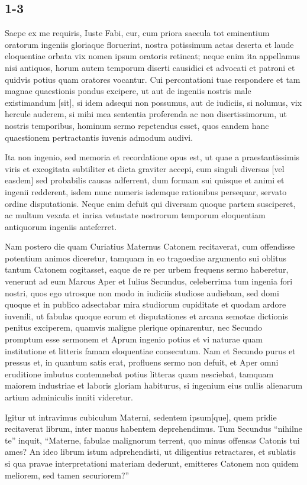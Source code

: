 \subsection*{1-3}

Saepe ex me requiris, Iuste Fabi, cur, cum priora saecula tot eminentium oratorum ingeniis gloriaque floruerint, nostra potissimum aetas deserta et laude eloquentiae orbata vix nomen ipsum oratoris retineat; neque enim ita appellamus nisi antiquos, horum autem temporum diserti causidici et advocati et patroni et quidvis potius quam oratores vocantur. Cui percontationi tuae respondere et tam magnae quaestionis pondus excipere, ut aut de ingeniis nostris male existimandum [sit], si idem adsequi non possumus, aut de iudiciis, si nolumus, vix hercule auderem, si mihi mea sententia proferenda ac non disertissimorum, ut nostris temporibus, hominum sermo repetendus esset, quos eandem hanc quaestionem pertractantis iuvenis admodum audivi. 

Ita non ingenio, sed memoria et recordatione opus est, ut quae a praestantissimis viris et excogitata subtiliter et dicta graviter accepi, cum singuli diversas [vel easdem] sed probabilis causas adferrent, dum formam sui quisque et animi et ingenii redderent, isdem nunc numeris isdemque rationibus persequar, servato ordine disputationis. Neque enim defuit qui diversam quoque partem susciperet, ac multum vexata et inrisa vetustate nostrorum temporum eloquentiam antiquorum ingeniis anteferret.

Nam postero die quam Curiatius Maternus Catonem recitaverat, cum offendisse potentium animos diceretur, tamquam in eo tragoediae argumento sui oblitus tantum Catonem cogitasset, eaque de re per urbem frequens sermo haberetur, venerunt ad eum Marcus Aper et Iulius Secundus, celeberrima tum ingenia fori nostri, quos ego utrosque non modo in iudiciis studiose audiebam, sed domi quoque et in publico adsectabar mira studiorum cupiditate et quodam ardore iuvenili, ut fabulas quoque eorum et disputationes et arcana semotae dictionis penitus exciperem, quamvis maligne plerique opinarentur, nec Secundo promptum esse sermonem et Aprum ingenio potius et vi naturae quam institutione et litteris famam eloquentiae consecutum. Nam et Secundo purus et pressus et, in quantum satis erat, profluens sermo non defuit, et Aper omni eruditione imbutus contemnebat potius litteras quam nesciebat, tamquam maiorem industriae et laboris gloriam habiturus, si ingenium eius nullis alienarum artium adminiculis inniti videretur.

Igitur ut intravimus cubiculum Materni, sedentem ipsum[que], quem pridie recitaverat librum, inter manus habentem deprehendimus. Tum Secundus ``nihilne te'' inquit, ``Materne, fabulae malignorum terrent, quo minus offensas Catonis tui ames? An ideo librum istum adprehendisti, ut diligentius retractares, et sublatis si qua pravae interpretationi materiam dederunt, emitteres Catonem non quidem meliorem, sed tamen securiorem?''

